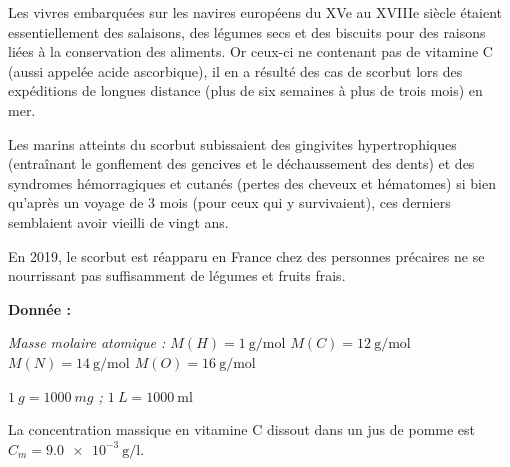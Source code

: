
\medskip
Les vivres embarquées sur les navires européens du XVe au XVIIIe siècle étaient essentiellement des salaisons, des légumes secs et des biscuits pour des raisons liées à la conservation des aliments. Or ceux-ci ne contenant pas de vitamine C (aussi appelée acide ascorbique), il en a résulté des cas de scorbut lors des expéditions de longues distance (plus de six semaines à plus de trois mois) en mer.

\medskip
Les marins atteints du scorbut subissaient des gingivites hypertrophiques (entraînant le gonflement des gencives et le déchaussement des dents) et des syndromes hémorragiques et cutanés (pertes des cheveux et hématomes) si bien qu'après un voyage de 3 mois (pour ceux qui y survivaient), ces derniers semblaient avoir vieilli de vingt ans. 

\medskip
En 2019, le scorbut est réapparu en France chez des personnes précaires ne se nourrissant pas suffisamment de légumes et fruits frais.

\medskip

\medskip
\textbf{Donnée : } 

\textit{Masse molaire atomique : $M(H) = \qty{1} {\g\per\mole}$ $M(C) = \qty{12} {\g\per\mole}$ $M(N) = \qty{14} {\g\per\mole}$ $M(O) = \qty{16} {\g\per\mole}$}

\textit{ $\qty{1} {g} = \qty{1 000} {mg}$   ;  $\qty{1} {L} = \qty{1 000} {\ml}$ }

\bigskip
{}

La concentration massique en vitamine C dissout dans un jus de pomme est $C_m = \qty{9,0e-3}{\g\per\litre}$.



